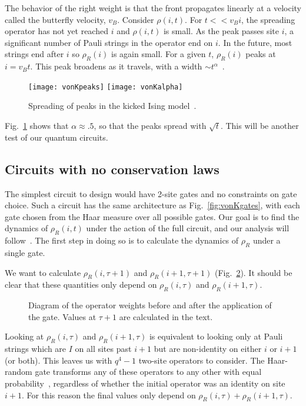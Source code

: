 \documentclass[a4paper,11pt]{article}
\renewcommand{\t}{\tau}
\begin{document}
The behavior of the right weight is that the front propagates linearly at a velocity called the butterfly velocity, $v_B$. Consider $\rho(i,t)$. For $t<<v_B i$, the spreading operator has not yet reached $i$ and $\rho(i,t)$ is small. As the peak passes site $i$, a significant number of Pauli strings in the operator end on $i$. In the future, most strings end after $i$ so $\rho_R(i)$ is again small. For a given $t$, $\rho_R(i)$ peaks at $i=v_B t$. This peak broadens as it travels, with a width $\sim t^\alpha$~\cite{vonKeyserlingkHydro}.
\begin{figure}
	\centering
	\texttt{[image: vonKpeaks]}
	\texttt{[image: vonKalpha]}
	\caption{Spreading of peaks in the kicked Ising model~\cite{vonKeyserlingkHydro}.}
	\label{fig:vonKalpha}
\end{figure}
Fig.~\ref{fig:vonKalpha} shows that $\alpha\approx .5$, so that the peaks spread with $\sqrt{t}$. This will be another test of our quantum circuits.

\subsection{Circuits with no conservation laws} \label{sub:cncons}

The simplest circuit to design would have 2-site gates and no constraints on gate choice. Such a circuit has the same architecture as Fig.~\ref{fig:vonKgates}, with each gate chosen from the Haar measure over all possible gates. Our goal is to find the dynamics of $\rho_R(i,t)$ under the action of the full circuit, and our analysis will follow~\cite{vonKeyserlingkHydro}. The first step in doing so is to calculate the dynamics of $\rho_R$ under a single gate. 

We want to calculate $\rho_R(i,\tau+1)$ and $\rho_R(i+1, \tau+1)$ (Fig.~\ref{fig:2sites}). It should be clear that these quantities only depend on $\rho_R(i,\tau)$ and $\rho_R(i+1, \tau)$. 
\begin{figure}
	\centering
	
	\caption{Diagram of the operator weights before and after the application of the gate. Values at $\t+1$ are calculated in the text.}
	\label{fig:2sites}
\end{figure}
Looking at $\rho_R(i,\tau)$ and $\rho_R(i+1, \tau)$ is equivalent to looking only at Pauli strings which are $I$ on all sites past $i+1$ but are non-identity on either $i$ or $i+1$ (or both).
This leaves us with $q^4-1$ two-site operators to consider. The Haar-random gate transforms any of these operators to any other with equal probability~\cite{BrownScrambling}, regardless of whether the initial operator was an identity on site $i+1$. For this reason the final values only depend on $\rho_R(i,\tau) + \rho_R(i+1, \tau)$.
\end{document}
